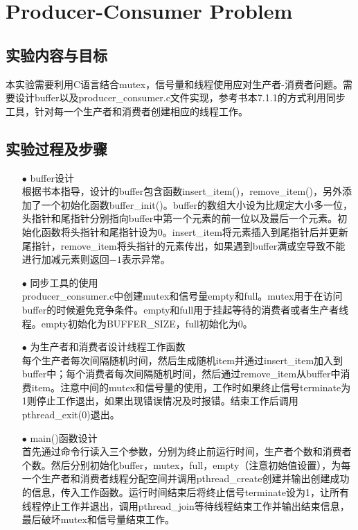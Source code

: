 \documentclass{article}
\begin{document}
\section{Producer-Consumer Problem}
\subsection{实验内容与目标}
本实验需要利用C语言结合mutex，信号量和线程使用应对生产者-消费者问题。需要设计buffer以及producer\_consumer.c文件实现，参考书本7.1.1的方式利用同步工具，针对每一个生产者和消费者创建相应的线程工作。
\subsection{实验过程及步骤}
\begin{itemize}
\item[$\bullet$]buffer设计\\
根据书本指导，设计的buffer包含函数insert\_item()，remove\_item()，另外添加了一个初始化函数buffer\_init()。buffer的数组大小设为比规定大小多一位，头指针和尾指针分别指向buffer中第一个元素的前一位以及最后一个元素。初始化函数将头指针和尾指针设为0。insert\_item将元素插入到尾指针后并更新尾指针，remove\_item将头指针的元素传出，如果遇到buffer满或空导致不能进行加减元素则返回$-1$表示异常。
\item[$\bullet$]同步工具的使用\\
producer\_consumer.c中创建mutex和信号量empty和full。mutex用于在访问buffer的时候避免竞争条件。empty和full用于挂起等待的消费者或者生产者线程。empty初始化为BUFFER\_SIZE，full初始化为0。
\item[$\bullet$]为生产者和消费者设计线程工作函数\\
每个生产者每次间隔随机时间，然后生成随机item并通过insert\_item加入到buffer中；每个消费者每次间隔随机时间，然后通过remove\_item从buffer中消费item。注意中间的mutex和信号量的使用，工作时如果终止信号terminate为1则停止工作退出，如果出现错误情况及时报错。结束工作后调用pthread\_exit(0)退出。
\item[$\bullet$]main()函数设计\\
首先通过命令行读入三个参数，分别为终止前运行时间，生产者个数和消费者个数。然后分别初始化buffer，mutex，full，empty（注意初始值设置），为每一个生产者和消费者线程分配空间并调用pthread\_create创建并输出创建成功的信息，传入工作函数。运行时间结束后将终止信号terminate设为1，让所有线程停止工作并退出，调用pthread\_join等待线程结束工作并输出结束信息，最后破坏mutex和信号量结束工作。
\end{itemize}
\end{document}
